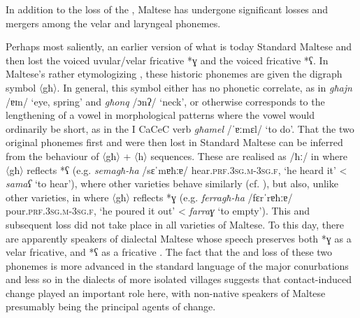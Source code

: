 \documentclass[output=paper]{langsci/langscibook}
\begin{document}
In addition to the loss of the , Maltese has undergone significant losses and mergers among the velar and laryngeal phonemes.

Perhaps most saliently, an earlier version of what is today  Standard Maltese  and then lost the voiced uvular/velar fricative *ɣ and the voiced  fricative *ʕ. In Maltese's rather etymologizing , these historic phonemes are given the digraph symbol 〈għ〉. In general, this symbol either has no phonetic correlate, as in \textit{għajn} /ɐɪn/ `eye, spring' and \textit{għonq} /ɔnʔ/ `neck', or otherwise corresponds to the lengthening of a vowel in morphological patterns where the vowel would ordinarily be short, as in the  I {CaCeC} verb \textit{għamel} /ˈɐːmɛl/ `to do'. That the two original phonemes first  and were then lost in  Standard Maltese can be inferred from the behaviour of 〈għ〉 + 〈h〉 sequences. These are realised as /ħː/ in  where 〈għ〉 reflects *ʕ (e.g. \textit{semagħ-ha} /sɛˈmɐħːɐ/ hear.\textsc{prf.3sg.m-3sg.f}, `he heard it' < \textit{samaʕ} `to hear'), where other  varieties behave similarly (cf. \citealt[18] {Woidich2006}), but also, unlike other  varieties, in  where 〈għ〉 reflects *ɣ (e.g. \textit{ferragħ-ha} /fɛrˈrɐħːɐ/ pour.\textsc{prf.3sg.m-3sg.f}, `he poured it out' < \textit{farraɣ} `to empty'). This  and subsequent loss did not take place in all varieties of Maltese. To this day, there are apparently speakers of dialectal Maltese whose speech preserves both *ɣ as a velar fricative, and *ʕ as a  fricative \citep{klimiuk2017}. The fact that the  and loss of these two phonemes is more advanced in the standard language of the major conurbations and less so in the dialects of more isolated villages suggests that contact-induced change played an important role here, with non-native speakers of Maltese presumably being the principal agents of change.
\end{document}
